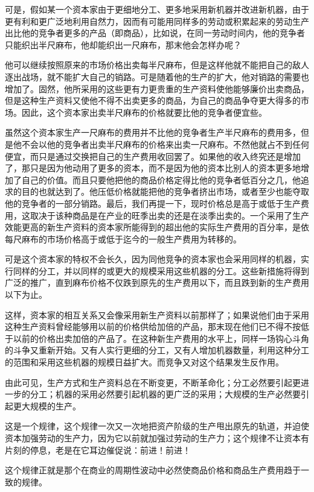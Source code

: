 \documentclass[a4paper,twoside,12pt,AutoFakeBold]{ctexart}
\begin{document}
可是，假如某一个资本家由于更细地分工、更多地采用新机器并改进新机器，由于更有利和更广泛地利用自然力，因而有可能用同样多的劳动或积累起来的劳动生产出比他的竞争者更多的产品（即商品），比如说，在同一劳动时间内，他的竞争者只能织出半尺麻布，他却能织出一尺麻布，那末他会怎样办呢？

他可以继续按照原来的市场价格出卖每半尺麻布，但是这样他就不能把自己的敌人逐出战场，就不能扩大自己的销路。可是随着他的生产的扩大，他对销路的需要也增加了。固然，他所采用的这些更有力更贵重的生产资料使他能够廉价出卖商品，但是这种生产资料又使他不得不出卖更多的商品，为自己的商品争夺更大得多的市场。因此，这个资本家出卖半尺麻布的价格就要比他的竞争者便宜些。

虽然这个资本家生产一尺麻布的费用并不比他的竞争者生产半尺麻布的费用多，但是他不会以他的竞争者出卖半尺麻布的价格来出卖一尺麻布。不然他就占不到任何便宜，而只是通过交换把自己的生产费用收回罢了。如果他的收入终究还是增加了，那只是因为他动用了更多的资本，而不是因为他的资本比别人的资本更多地增加了自己的价值。而且只要他把他的商品价格定得比他的竞争者低百分之几，他追求的目的也就达到了。他压低价格就能把他的竞争者挤出市场，或者至少也能夺取他的竞争者的一部分销路。最后，我们再提一下，现时价格总是高于或低于生产费用，这取决于该种商品是在产业的旺季出卖的还是在淡季出卖的。一个采用了生产效能更高的新生产资料的资本家所能得到的超出他的实际生产费用的百分率，是依每尺麻布的市场价格高于或低于迄今的一般生产费用为转移的。

可是这个资本家的特权不会长久，因为同他竞争的资本家也会采用同样的机器，实行同样的分工，并以同样的或更大的规模采用这些机器的分工。这些新措施将得到广泛的推广，直到麻布价格不仅跌到原先的生产费用以下，而且跌到新的生产费用以下为止。

这样，资本家的相互关系又会像采用新生产资料以前那样了；如果说他们由于采用这种生产资料曾经能够用以前的价格供给加倍的产品，那末现在他们已不得不按低于以前的价格出卖加倍的产品了。在这种新生产费用的水平上，同样一场钩心斗角的斗争又重新开始。又有人实行更细的分工，又有人增加机器数量，利用这种分工的范围和采用这些机器的规模日益扩大。而竞争又对这个结果发生反作用。

由此可见，生产方式和生产资料总在不断变更，不断革命化；分工必然要引起更进一步的分工；机器的采用必然要引起机器的更广泛的采用；大规模的生产必然要引起更大规模的生产。

这是一个规律，这个规律一次又一次地把资产阶级的生产甩出原先的轨道，并迫使资本加强劳动的生产力，因为它以前就加强过劳动的生产力；这个规律不让资本有片刻的停息，老是在它耳边催促说：前进！前进！

这个规律正就是那个在商业的周期性波动中必然使商品价格和商品生产费用趋于一致的规律。
\end{document}
